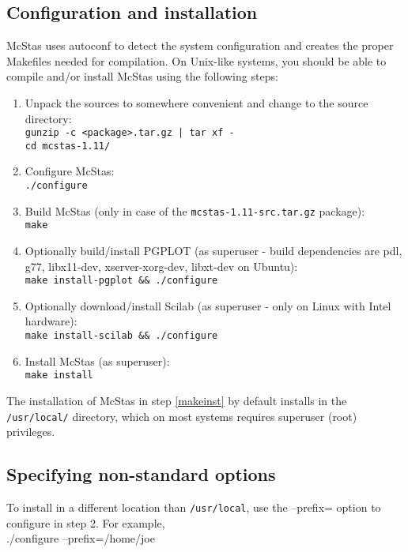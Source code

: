 \subsection{Configuration and installation}
McStas uses autoconf to detect the system configuration and creates the
proper Makefiles needed for compilation. On Unix-like systems, you
should be able to compile and/or install McStas using the following steps:
\begin{enumerate}
\item{Unpack the sources to somewhere convenient and change to the
    source directory:\\
  \texttt{gunzip -c <package>.tar.gz | tar xf -}\\
  \texttt{cd mcstas-1.11/}}
\item{Configure McStas:\\
  \texttt{./configure}}
\item{Build McStas (only in case of the \verb+mcstas-1.11-src.tar.gz+ package):\\
  \texttt{make}}
\item{Optionally build/install PGPLOT (as superuser - build
    dependencies are pdl, g77, libx11-dev, xserver-xorg-dev, libxt-dev
    on Ubuntu):\\
    \texttt{make install-pgplot \&\& ./configure}
    \label{pg_install}}
\item{Optionally download/install Scilab (as superuser - only on Linux
    with Intel hardware):\\
    \texttt{make install-scilab \&\& ./configure}
    \label{sci_install}}
\item{Install McStas (as superuser):\\
  \texttt{make install}
\label{makeinst}}
\end{enumerate}



\noindent The installation of McStas in step \ref{makeinst} by default installs in the
\texttt{/usr/local/} directory, which on most systems requires superuser (root)
privileges.

\subsection{Specifying non-standard options}
To install in a different location than \texttt{/usr/local}, use the --prefix= option to
configure in step 2. For example,\\

  ./configure --prefix=/home/joe\\

